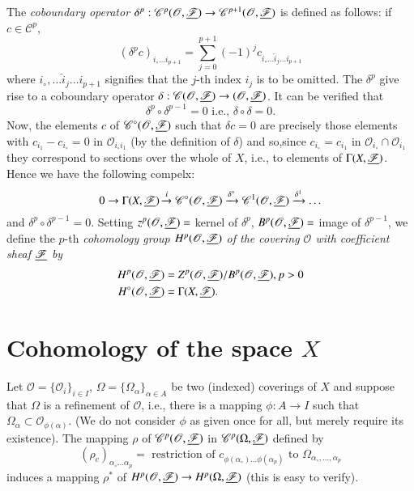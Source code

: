 The \textit{coboundary operator} $\delta^p: \mathscr{C}^p
(\mathscr{O}, \underline{\mathscr{F}}) \to \mathscr{C}^{p+1} (\mathscr{O},
\underline{\mathscr{F}})$  is defined as follows: if $c \in \mathscr{C}^p$,
$$
(\delta^p c)_{i_\circ \ldots i_{p+1}} = \sum\limits^{p+1}_{j=0} (-1)^j
c_{i_\circ \ldots \hat{i}_j \ldots i_{p+1}}
$$ 
where $i_\circ, \ldots \hat{i}_j \ldots i_{p+1}$ signifies that the
$j$-th index $i_j$ is to be omitted. The $\delta^p$ give rise to a
coboundary operator $\delta: \mathscr{C} (\mathscr{O},
\underline{\mathscr{F}}) \to (\mathscr{O}, \underline{\mathscr{F}})$. It can be
verified that 
$$
\delta^p \circ \delta^{p-1} = 0 \text{ i.e., } \delta \circ \delta = 0.
$$
Now, the elements $c$ of $\mathscr{C}^\circ (\mathscr{O},
\underline{\mathscr{F}})$ such that $\delta c = 0$ are precisely those
elements with $c_{i_1} - c_{i_\circ} = 0$ in $\mathscr{O}_{i_\circ
  i_1}$ (by the definition of $\delta$) and so,\pageoriginale since
$c_{i_\circ} = c_{i_1}$ in $\mathscr{O}_{i_\circ} \cap
\mathscr{O}_{i_1}$ they correspond to sections over the whole of $X$,
i.e., to elements of $\Gamma(X, \underline{\mathscr{F}})$. Hence we have the
following compelx:
$$
0 \to \Gamma (X, \underline{\mathscr{F}}) \xrightarrow{i} \mathscr{C}^\circ
(\mathscr{O}, \underline{\mathscr{F}})  \xrightarrow{\delta^\circ}
\mathscr{C}^1 (\mathscr{O}, \underline{\mathscr{F}}) \xrightarrow{\delta^1} \ldots
$$
and $\delta^p \circ \delta^{p-1} = 0$. Setting $z^p (\mathscr{O},
\underline{\mathscr{F}}) = $ kernel of $\delta^p$, $B^p (\mathscr{O},
\underline{\mathscr{F}}) = $ image of $\delta^{p-1}$, we define the $p$-th
\textit{cohomology group $H^p (\mathscr{O}, \underline{\mathscr{F}})$ of the
  covering $\mathscr{O}$ with coefficient sheaf $\underline{\mathscr{F}}$ by}
\begin{align*}
 H^p (\mathscr{O}, \underline{\mathscr{F}}) & = Z^p (\mathscr{O},
 \underline{\mathscr{F}})/ B^p (\mathscr{O}, \underline{\mathscr{F}}), p >0\\
 H^\circ  (\mathscr{O}, \underline{\mathscr{F}}) & = \Gamma (X,
 \underline{\mathscr{F}}).  
\end{align*}

\section{Cohomology of the space \texorpdfstring{$X$}{X}}\label{chap13:sec2}

Let $\mathscr{O} = \{\mathscr{O}_i\}_{i\in I}$, $\Omega =
\{\Omega_\alpha\}_{\alpha \in A}$ be two (indexed) coverings of $X$
and suppose that $\Omega$ is a refinement of $\mathscr{O}$, i.e.,
there is a mapping $\phi: A \to I$ such that $\Omega_\alpha \subset
\mathscr{O}_{\phi(\alpha)}$. (We do not consider $\phi$ as given once
for all, but merely require its existence). The mapping $\rho$ of
$\mathscr{C}^p (\mathscr{O}, \underline{\mathscr{F}})$ in $\mathscr{C}^p
(\Omega,\underline{\mathscr{F}})$ defined by  
$$
(\rho_c)_{\alpha_\circ \ldots \alpha_p} = \text{ restriction  of }
c_{\phi(\alpha_\circ) \ldots \phi (\alpha_p)}  \text{ to }
\Omega_{\alpha_\circ, \ldots, \alpha_p} 
$$
induces a mapping $\rho^\ast$ of $H^p(\mathscr{O}, \underline{\mathscr{F}})
\to H^p (\Omega, \underline{\mathscr{F}})$ (this is easy to verify). 

